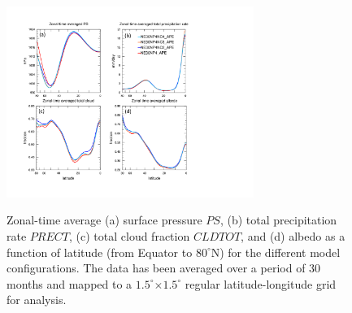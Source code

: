\documentclass[twocol]{ametsoc}
\begin{document}



\begin{figure}[t]
\noindent\includegraphics[width=19pc,angle=0]{figs/zonal_time_avg_2d_fields.pdf}\\
\caption{Zonal-time average (a) surface pressure $PS$, (b) total precipitation rate $PRECT$, (c) total cloud fraction $CLDTOT$, and (d) albedo as a function of latitude (from Equator to $80^\circ$N) for the different model configurations. The data has been averaged over a period of 30 months and mapped to a $1.5^\circ$$\times$$1.5^\circ$ regular latitude-longitude grid for analysis.}
\end{figure}

\end{document}
